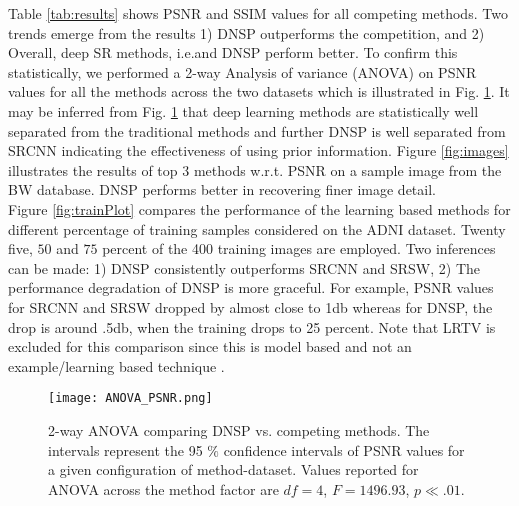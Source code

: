 \documentclass{article}
\def\sqz{\vspace{-3pt}}
\begin{document}
\sqz\sqz\sqz\sqz\sqz\sqz
\noindent Table \ref{tab:results} shows PSNR and SSIM values for all competing methods. Two trends emerge from the results 1) DNSP outperforms the competition, and 2) Overall, deep SR methods, i.e.\SRCNN and DNSP perform better. To confirm this statistically, we performed a 2-way Analysis of variance (ANOVA) on PSNR values for all the methods across the two datasets which is illustrated in Fig. \ref{fig:ANOVA}. It may be inferred from Fig. \ref{fig:ANOVA} that deep learning methods are statistically well separated from the traditional methods and further DNSP is well separated from SRCNN indicating the effectiveness of using prior information. Figure \ref{fig:images} illustrates the results of top 3 methods w.r.t. PSNR on a sample image from the BW database. DNSP performs better in recovering  finer image detail. \\
Figure \ref{fig:trainPlot} compares the performance of the learning based methods for different percentage of training samples considered on the ADNI dataset. Twenty five, $50$ and $75$ percent of the 400 training images are employed. Two inferences can be made: 1) DNSP consistently outperforms  SRCNN and SRSW, 2) The performance degradation of DNSP is more graceful. For example, PSNR values for SRCNN and SRSW dropped by almost close to 1db whereas for DNSP, the drop is around .5db, when the training drops to 25 percent.
Note that LRTV is excluded for this comparison since this is model based and not an example/learning based technique \cite{shi2015lrtv}.

 \begin{figure}
 \begin{center}
  \texttt{[image: ANOVA\_PSNR.png]}
 \end{center}
  \vspace{-.5cm}
  \caption{\small{2-way ANOVA comparing DNSP vs. competing methods. The intervals represent the 95 $\%$ confidence intervals of PSNR values for a given configuration of method-dataset. Values reported for ANOVA across the method factor are $df = 4$, $F = 1496.93$, $p\ll .01$.}}\vspace{-10pt}
  \label{fig:ANOVA}
\end{figure}
\end{document}
